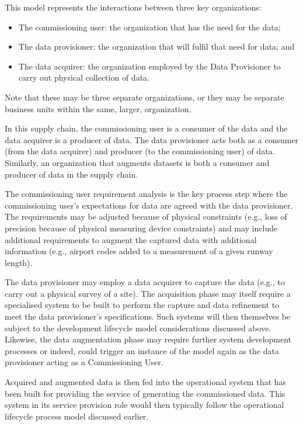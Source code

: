 This model represents the interactions between three key organizations:
\begin{itemize}
  \item The commissioning user: the organization that has the need for the data;
  \item The data provisioner: the organization that will fulfil that need for data; and
  \item The data acquirer: the organization employed by the Data Provisioner to carry out physical collection of data.
\end{itemize}

Note that these may be three separate organizations, or they may be separate business units within the same, larger, organization.

In this supply chain, the commissioning user is a consumer of the data and the data acquirer is a producer of data. The data provisioner acts both as a consumer (from the data acquirer) and producer (to the commissioning user) of data. Similarly, an organization that augments \glspl{dataset} is both a consumer and producer of data in the supply chain.

The commissioning user requirement analysis is the key process step where the commissioning user's expectations for data are agreed with the data provisioner. The requirements may be adjusted because of physical constraints (e.g., loss of precision because of physical measuring device constraints) and may include additional requirements to augment the captured data with additional \gls{information} (e.g., airport codes added to a measurement of a given runway length).

The data provisioner may employ a data acquirer to capture the data (e.g., to carry out a physical survey of a site). The acquisition phase may itself require a specialised system to be built to perform the capture and data refinement to meet the data provisioner's specifications. Such systems will then themselves be subject to the development lifecycle model considerations discussed above. Likewise, the data augmentation phase may require further system development processes or indeed, could trigger an instance of the model again as the data provisioner acting as a Commissioning User.

Acquired and augmented data is then fed into the operational system that has been built for providing the service of generating the commissioned data. This system in its service provision role would then typically follow the operational lifecycle process model discussed earlier.

